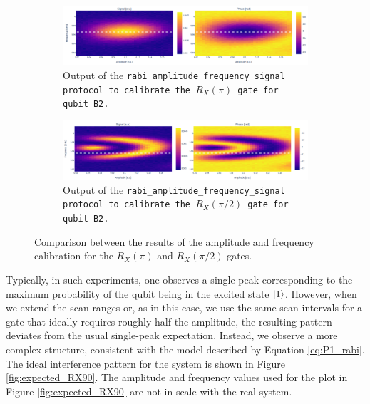 \begin{figure}[h!]
    \centering
    \begin{subfigure}[t]{\textwidth}
        \includegraphics[width=\textwidth]{figures/png/RX90/RabiAmplitudeFrequency/B2.png}
        \caption{Output of the \tt{rabi\_amplitude\_frequency\_signal} protocol to calibrate the $R_X(\pi)$ gate for qubit \tt{B2}.}
        \label{fig:B2}
    \end{subfigure}
    \vspace{0.3cm}
    \begin{subfigure}[t]{\textwidth}
        \includegraphics[width=\textwidth]{figures/png/RX90/RabiAmplitudeFrequency/B2_90.png}
        \caption{Output of the \tt{rabi\_amplitude\_frequency\_signal} protocol to calibrate the $R_X(\pi/2)$ gate for qubit \tt{B2}.}
        \label{fig:B2_90}
    \end{subfigure}
    \caption{Comparison between the results of the amplitude and frequency calibration for the $R_X(\pi)$ and $R_X(\pi/2)$ gates.}
    \label{fig:af_comparison}
\end{figure}

Typically, in such experiments, one observes a single peak corresponding to the maximum probability of the qubit being in the excited state $\ket{1}$. 
However, when we extend the scan ranges or, as in this case, we use the same scan intervals for a gate that ideally requires roughly half the amplitude, the resulting pattern deviates from the usual single-peak expectation. 
Instead, we observe a more complex structure, consistent with the model described by Equation \ref{eq:P1_rabi}.
The ideal interference pattern for the system is shown in Figure \ref{fig:expected_RX90}. 
The amplitude and frequency values used for the plot in Figure \ref{fig:expected_RX90} are not in scale with the real system.

